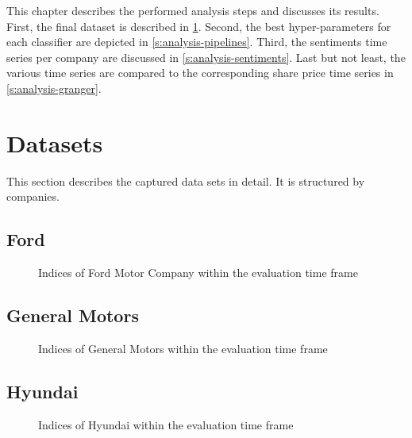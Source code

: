 
This chapter describes the performed analysis steps and discusses its results.
First, the final dataset is described in \cref{s:analysis-datasets}.
Second, the best hyper-parameters for each classifier are depicted in \cref{s:analysis-pipelines}.
Third, the sentiments time series per company are discussed in \cref{s:analysis-sentiments}.
Last but not least, the various time series are compared to the corresponding share price time series in \cref{s:analysis-granger}.

\section{Datasets}
\label{s:analysis-datasets}

This section describes the captured data sets in detail.
It is structured by companies.

\subsection{Ford}
\label{ss:analysis-datasets-ford}

\begin{figure}[hbt]
    \centering
        
    \caption{Indices of Ford Motor Company within the evaluation time frame}
    \label{fig:analysis-indices-ford}
\end{figure}    

\subsection{General Motors}
\label{ss:analysis-datasets-gm}

\begin{figure}[hbt]
    \centering
        
    \caption{Indices of General Motors within the evaluation time frame}
    \label{fig:analysis-indices-gm}
\end{figure}   

\subsection{Hyundai}
\label{ss:analysis-datasets-hyundai}

\begin{figure}[hbt]
    \centering
        
    \caption{Indices of Hyundai within the evaluation time frame}
    \label{fig:analysis-indices-hyundai}
\end{figure}   


